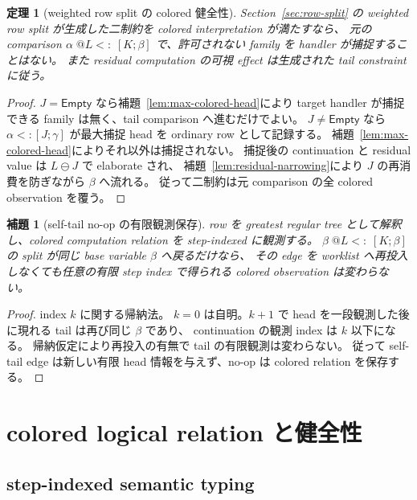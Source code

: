 \documentclass[uplatex,dvipdfmx,a4paper,10.5pt]{jsarticle}
\makeatletter
\theoremstyle{jpplain}
\newtheorem{lemma}[definition]{補題}
\newtheorem{theorem}[definition]{定理}
\newcommand{\Empty}{\mathsf{Empty}}
\newcommand{\row}[2]{[#1;#2]}
\newcommand{\lsub}[3]{#1\;@#2\mathrel{<:}\;#3}
\makeatother
\begin{document}
\begin{theorem}[weighted row split の colored 健全性]\label{thm:colored-row-split}
Section~\ref{sec:row-split} の weighted row split が生成した二制約を colored interpretation が満たすなら、
元の comparison $\lsub{\alpha}{L}{\row{K}{\beta}}$ で、許可されない family を handler が捕捉することはない。
また residual computation の可視 effect は生成された tail constraint に従う。
\end{theorem}

\begin{proof}
$J=\Empty$ なら補題~\ref{lem:max-colored-head}により target handler が捕捉できる family は無く、tail comparison へ進むだけでよい。
$J\neq\Empty$ なら $\alpha<:\row{J}{\gamma}$ が最大捕捉 head を ordinary row として記録する。
補題~\ref{lem:max-colored-head}によりそれ以外は捕捉されない。
捕捉後の continuation と residual value は $L\ominus J$ で elaborate され、
補題~\ref{lem:residual-narrowing}により $J$ の再消費を防ぎながら $\beta$ へ流れる。
従って二制約は元 comparison の全 colored observation を覆う。
\end{proof}

\begin{lemma}[self-tail no-op の有限観測保存]\label{lem:self-tail-colored}
row を greatest regular tree として解釈し、colored computation relation を step-indexed に観測する。
$\lsub{\beta}{L}{\row{K}{\beta}}$ の split が同じ base variable $\beta$ へ戻るだけなら、
その edge を worklist へ再投入しなくても任意の有限 step index で得られる colored observation は変わらない。
\end{lemma}

\begin{proof}
index $k$ に関する帰納法。
$k=0$ は自明。$k+1$ で head を一段観測した後に現れる tail は再び同じ $\beta$ であり、
continuation の観測 index は $k$ 以下になる。
帰納仮定により再投入の有無で tail の有限観測は変わらない。
従って self-tail edge は新しい有限 head 情報を与えず、no-op は colored relation を保存する。
\end{proof}

\section{colored logical relation と健全性}\label{sec:colored-soundness}

\subsection{step-indexed semantic typing}
\end{document}
